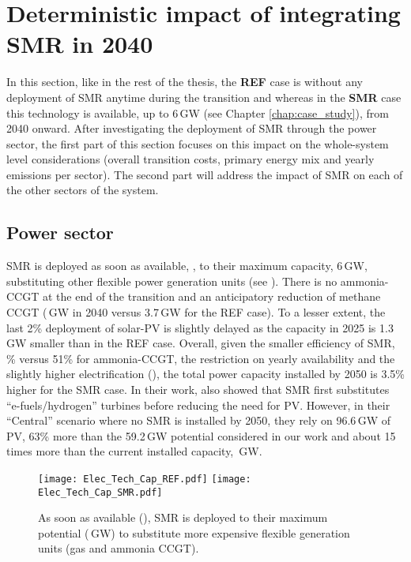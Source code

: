 \section[Deterministic impact of integrating SMR in 2040]{Deterministic impact of integrating \gls{SMR} in 2040}
\label{sec:atom_mol:results_deter} 
In this section, like in the rest of the thesis, the \textbf{REF} case is without any deployment of \gls{SMR} anytime during the transition and whereas in the \textbf{SMR} case this technology is available, up to 6\,GW (see Chapter \ref{chap:case_study}), from 2040 onward. After investigating the deployment of \gls{SMR} through the power sector, the first part of this section focuses on this impact on the whole-system level considerations (\ie overall transition costs, primary energy mix and yearly emissions per sector). The second part will address the impact of \gls{SMR} on each of the other sectors of the system.

\subsection{Power sector}
\label{subsec:atom_mol:results_deter_power_sector}
\gls{SMR} is deployed as soon as available, , to their maximum capacity, 6\,GW, substituting other flexible power generation units (see ). There is no ammonia-\gls{CCGT} at the end of the transition and an anticipatory reduction of methane \gls{CCGT} (\,GW in 2040 versus 3.7\,GW for the REF case). To a lesser extent, the last 2\% deployment of solar-\gls{PV} is slightly delayed as the capacity in 2025 is 1.3\,GW smaller than in the REF case. Overall, given the smaller efficiency of \gls{SMR}, \% versus 51\% for ammonia-\gls{CCGT}, the restriction on yearly availability and the slightly higher electrification (), the total power capacity installed by 2050 is 3.5\% higher for the SMR case. In their work, \citet{PATHS2050} also showed that \gls{SMR} first substitutes ``e-fuels/hydrogen'' turbines before reducing the need for \gls{PV}. However, in their ``Central'' scenario where no \gls{SMR} is installed by 2050, they rely on 96.6\,GW of \gls{PV}, 63\% more than the 59.2\,GW potential considered in our work and about 15 times more than the current installed capacity, \,GW. \\

\begin{figure}[htbp!]
\centering
\texttt{[image: Elec\_Tech\_Cap\_REF.pdf]}
\texttt{[image: Elec\_Tech\_Cap\_SMR.pdf]}
\caption{As soon as available (), \acrfull{SMR} is deployed to their maximum potential (\,GW) to substitute more expensive flexible generation units (\ie gas and ammonia \gls{CCGT}).}
\label{fig:results_deter_tech_cap_elec}
\end{figure}

